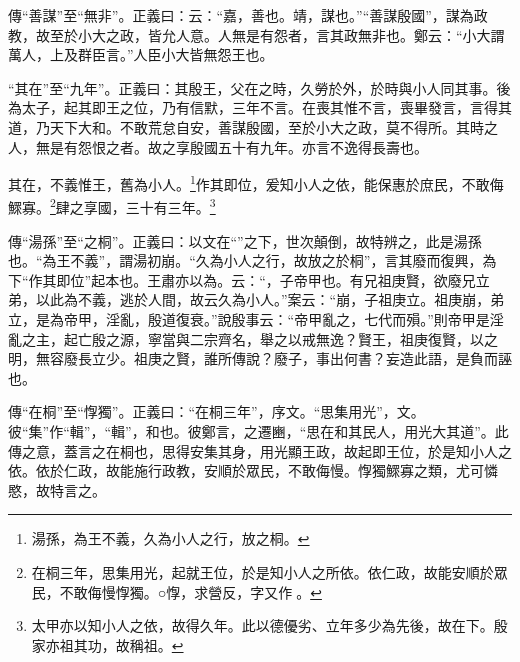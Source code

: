 {\noindent\zhuan{}\fzbyks 傳“善謀”至“無非”。正義曰：云：“嘉，善也。靖，謀也。”“善謀殷國”，謀為政教，故至於小大之政，皆允人意。人無是有怨者，言其政無非也。鄭云：“小大謂萬人，上及群臣言。”人臣小大皆無怨王也。 \par}

{\noindent\shu{}\fzkt “其在”至“九年”。正義曰：其殷王，父在之時，久勞於外，於時與小人同其事。後為太子，起其即王之位，乃有信默，三年不言。在喪其惟不言，喪畢發言，言得其道，乃天下大和。不敢荒怠自安，善謀殷國，至於小大之政，莫不得所。其時之人，無是有怨恨之者。故之享殷國五十有九年。亦言不逸得長壽也。 \par}

其在，不義惟王，舊為小人。\footnote{湯孫，為王不義，久為小人之行，放之桐。}作其即位，爰知小人之依，能保惠於庶民，不敢侮鰥寡。\footnote{在桐三年，思集用光，起就王位，於是知小人之所依。依仁政，故能安順於眾民，不敢侮慢惸獨。○惸，求營反，字又作𦬮。}肆之享國，三十有三年。\footnote{太甲亦以知小人之依，故得久年。此以德優劣、立年多少為先後，故在下。殷家亦祖其功，故稱祖。}


{\noindent\zhuan{}\fzbyks 傳“湯孫”至“之桐”。正義曰：以文在“”之下，世次顛倒，故特辨之，此是湯孫也。“為王不義”，謂湯初崩。“久為小人之行，故放之於桐”，言其廢而復興，為下“作其即位”起本也。王肅亦以為。云：“，子帝甲也。有兄祖庚賢，欲廢兄立弟，以此為不義，逃於人間，故云久為小人。”案云：“崩，子祖庚立。祖庚崩，弟立，是為帝甲，淫亂，殷道復衰。”說殷事云：“帝甲亂之，七代而殞。”則帝甲是淫亂之主，起亡殷之源，寧當與二宗齊名，舉之以戒無逸？賢王，祖庚復賢，以之明，無容廢長立少。祖庚之賢，誰所傳說？廢子，事出何書？妄造此語，是負而誣也。 \par}

{\noindent\zhuan{}\fzbyks 傳“在桐”至“惸獨”。正義曰：“在桐三年”，序文。“思集用光”，文。彼“集”作“輯”，“輯”，和也。彼鄭言，之遷豳，“思在和其民人，用光大其道”。此傳之意，蓋言之在桐也，思得安集其身，用光顯王政，故起即王位，於是知小人之依。依於仁政，故能施行政教，安順於眾民，不敢侮慢。惸獨鰥寡之類，尤可憐愍，故特言之。 \par}

